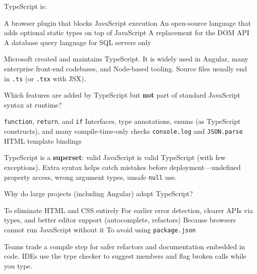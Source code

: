 



\question[4]
TypeScript is:
\begin{choices}
  \choice A browser plugin that blocks JavaScript execution
  \CorrectChoice An open-source language that adds optional static types on top of JavaScript
  \choice A replacement for the DOM API
  \choice A database query language for SQL servers only
\end{choices}
\begin{solution}
  Microsoft created and maintains TypeScript. It is widely used in Angular, many enterprise front-end codebases, and Node-based tooling. Source files usually end in \texttt{.ts} (or \texttt{.tsx} with JSX).
\end{solution}

\question[4]
Which features are added by TypeScript but \textbf{not} part of standard JavaScript syntax at runtime?
\begin{choices}
  \choice \texttt{function}, \texttt{return}, and \texttt{if}
  \CorrectChoice Interfaces, type annotations, enums (as TypeScript constructs), and many compile-time-only checks
  \choice \texttt{console.log} and \texttt{JSON.parse}
  \choice HTML template bindings
\end{choices}
\begin{solution}
  TypeScript is a \textbf{superset}: valid JavaScript is valid TypeScript (with few exceptions). Extra syntax helps catch mistakes before deployment---undefined property access, wrong argument types, unsafe \texttt{null} use.
\end{solution}

\question[4]
Why do large projects (including Angular) adopt TypeScript?
\begin{choices}
  \choice To eliminate HTML and CSS entirely
  \CorrectChoice For earlier error detection, clearer APIs via types, and better editor support (autocomplete, refactors)
  \choice Because browsers cannot run JavaScript without it
  \choice To avoid using \texttt{package.json}
\end{choices}
\begin{solution}
  Teams trade a compile step for safer refactors and documentation embedded in code. IDEs use the type checker to suggest members and flag broken calls while you type.
\end{solution}

